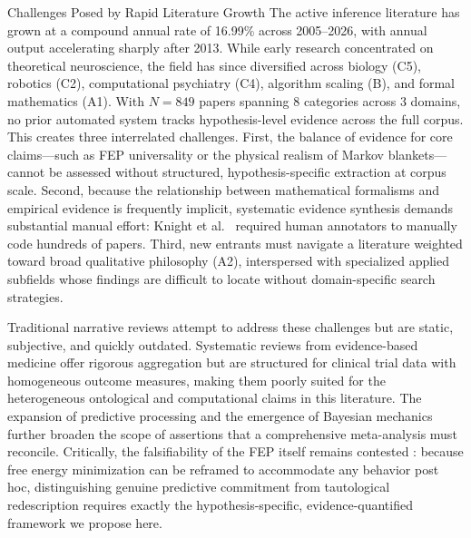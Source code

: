 \documentclass[
  ignorenonframetext,
]{beamer}
\begin{document}
\begin{frame}{Challenges Posed by Rapid Literature Growth}
\protect{}\label{challenges-posed-by-rapid-literature-growth}
The active inference literature has grown at a compound annual rate of
16.99\% across 2005--2026, with annual output accelerating sharply after
2013. While early research concentrated on theoretical neuroscience, the
field has since diversified across biology (C5), robotics (C2),
computational psychiatry (C4), algorithm scaling (B), and formal
mathematics (A1). With \(N = 849\) papers spanning 8 categories across 3
domains, no prior automated system tracks hypothesis-level evidence
across the full corpus. This creates three interrelated challenges.
First, the balance of evidence for core claims---such as FEP
universality or the physical realism of Markov blankets---cannot be
assessed without structured, hypothesis-specific extraction at corpus
scale. Second, because the relationship between mathematical formalisms
and empirical evidence is frequently implicit, systematic evidence
synthesis demands substantial manual effort: Knight et
al.~\citep{knight2022fep} required human annotators to manually code
hundreds of papers. Third, new entrants must navigate a literature
weighted toward broad qualitative philosophy (A2), interspersed with
specialized applied subfields whose findings are difficult to locate
without domain-specific search strategies.

Traditional narrative reviews attempt to address these challenges but
are static, subjective, and quickly outdated. Systematic reviews from
evidence-based medicine offer rigorous aggregation but are structured
for clinical trial data with homogeneous outcome measures, making them
poorly suited for the heterogeneous ontological and computational claims
in this literature. The expansion of predictive processing
\citep{clark2013whatever, hohwy2013predictive} and the emergence of
Bayesian mechanics \citep{sakthivadivel2023bayesian} further broaden the
scope of assertions that a comprehensive meta-analysis must reconcile.
Critically, the falsifiability of the FEP itself remains contested
\citep{colombo2021free}: because free energy minimization can be
reframed to accommodate any behavior post hoc, distinguishing genuine
predictive commitment from tautological redescription requires exactly
the hypothesis-specific, evidence-quantified framework we propose here.
\end{frame}
\end{document}
